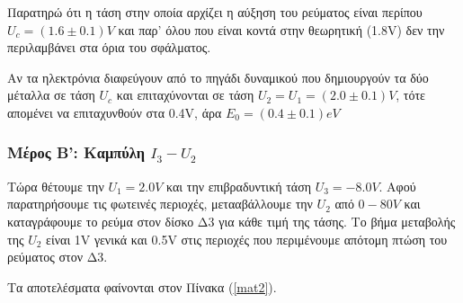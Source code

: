 \documentclass[a4paper]{article}
\begin{document}
	 	Παρατηρώ ότι η τάση στην οποία αρχίζει η αύξηση του ρεύματος είναι περίπου $U_c = (1.6\pm0.1)V$ και παρ' όλου που είναι κοντά στην θεωρητική (1.8V) δεν την περιλαμβάνει στα όρια του σφάλματος.
	 	
	 	Αν τα ηλεκτρόνια διαφεύγουν από το πηγάδι δυναμικού που δημιουργούν τα δύο μέταλλα σε τάση $U_c$ και επιταχύνονται σε τάση $U_2 = U_1=(2.0\pm0.1)V$, τότε απομένει να επιταχυνθούν στα 0.4V, άρα $E_0 = (0.4\pm0.1)eV$
	 	
	 	
	\subsubsection*{Μέρος Β': Καμπύλη $I_3-U_2$}
			Τώρα θέτουμε την $U_1 = 2.0 V$ και την επιβραδυντική τάση $U_3 = -8.0V$. Αφού παρατηρήσουμε τις φωτεινές περιοχές, μετααβάλλουμε την $U_2$ από $0-80V$ και καταγράφουμε το ρεύμα στον δίσκο Δ3 για κάθε τιμή της τάσης. Το βήμα μεταβολής της $U_2$ είναι  1V γενικά και 0.5V στις περιοχές που περιμένουμε απότομη πτώση του ρεύματος στον Δ3.
			
			Τα αποτελέσματα φαίνονται στον Πίνακα (\ref{mat2}).
			
\end{document}
